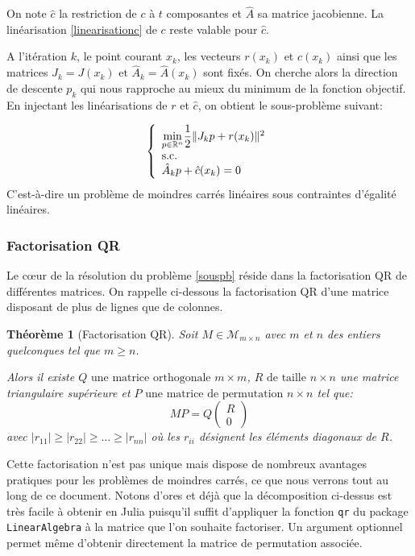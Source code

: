 \documentclass[a4paper,11pt]{article}
\newcommand{\real}{\mathbb{R}}
\newcommand{\ha}{\hat{A}}
\newcommand{\hc}{\hat{c}}
\numberwithin{equation}{section}
\def\mfabian#1{{\color{blue} #1}}
\begin{document}
On note $\hc$ la restriction de $c$ à $t$ composantes et $\ha$ sa matrice jacobienne. La linéarisation \ref{linearisationc} de $c$ reste valable pour $\hc$.

A l'itération $k$,  le point courant $x_{k}$, les vecteurs $r(x_{k})$ et $\hc(x_{k})$ ainsi que les matrices $J_{k}=J(x_{k}) \text{ et } \ha_{k}=\ha(x_{k})$ sont fixés. On cherche alors la direction de descente $p_{k}$ qui nous rapproche au mieux du minimum de la fonction objectif. En injectant les linéarisations de $r$ et $\hc$, on obtient le sous-problème suivant:

\begin{equation} \label{souspb}
\left\{ \begin{array}{l l l}
\underset{p \in \real^{n}}{\min} \dfrac{1}{2}\|J_{k}p+r(x_{k})\|^{2} \\
\text{s.c.} \\
\ha_{k}p+\hc(x_{k})=0
\end{array} \right.
\end{equation}
C'est-à-dire un problème de moindres carrés linéaires sous contraintes d'égalité linéaires.

\subsubsection{Factorisation QR} \label{factqr}

Le c\oe ur de la résolution du problème \ref{souspb} réside dans la factorisation QR de différentes matrices.  On rappelle ci-dessous la factorisation QR d'une matrice disposant de plus de lignes que de colonnes.

\newtheorem*{theo}{Théorème}
\begin{theo}[Factorisation QR]
Soit $M \in \mathcal{M}_{m\times n}$ avec $m$ et $n$ des entiers quelconques tel que $m\geq n$.

Alors il existe $Q\text{ une matrice orthogonale } m\times m$, $ R \text{ de taille }n \times n$ une matrice triangulaire supérieure et $P \text{ une matrice de permutation } n\times n$ tel que:
\[
MP = Q 
\begin{pmatrix} 
R \\ 
0
\end{pmatrix}
\]
avec $|r_{11}| \geq |r_{22}| \geq \ldots \geq |r_{nn}|$ où les $r_{ii}$ désignent les éléments diagonaux de $R$. 
\end{theo}

Cette factorisation n'est pas unique mais dispose de nombreux avantages pratiques pour les problèmes de moindres carrés, ce que nous verrons tout au long de ce \mfabian{document}. Notons d'ores et déjà que la décomposition ci-dessus est très facile à obtenir en Julia puisqu'il suffit d'appliquer la fonction \texttt{qr} du package \texttt{LinearAlgebra} à la matrice que l'on souhaite factoriser. \mfabian{U}n argument optionnel permet même d'obtenir directement la matrice de permutation associée.
\end{document}
